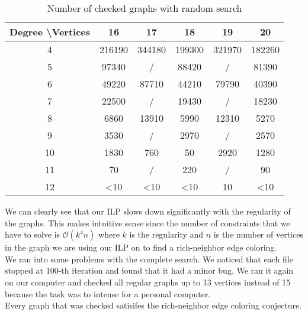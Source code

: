 \documentclass[12pt,a4paper]{amsart}
\theoremstyle{definition} %
\theoremstyle{plain} %
\begin{document}
    \begin{table}[!htbp]
        \begin{tabular}{|c|c|c|c|c|c|}
        \hline
        Degree \textbackslash Vertices & 16            & 17            & 18            & 19     & 20            \\ \hline
        4                              & 216190        & 344180        & 199300        & 321970 & 182260        \\
        5                              & 97340         & /             & 88420         & /      & 81390         \\
        6                              & 49220         & 87710         & 44210         & 79790  & 40390         \\
        7                              & 22500         & /             & 19430         & /      & 18230         \\
        8                              & 6860          & 13910         & 5990          & 12310  & 5270          \\
        9                              & 3530          & /             & 2970          & /      & 2570          \\
        10                             & 1830          & 760           & 50            & 2920   & 1280          \\
        11                             & 70            & /             & 220           & /      & 90            \\
        12                             & \textless{}10 & \textless{}10 & \textless{}10 & 10     & \textless{}10 \\ \hline
        \end{tabular}
        \caption{Number of checked graphs with random search}
        \label{table:2}
    \end{table}
    
    \noindent We can clearly see that our ILP slows down significantly with the regularity of the graphs. This makes intuitive sense since the number of constraints that we have to solve is $\mathcal{O}(k^4n)$ where $k$ is the regularity and $n$ is the number of vertices in the graph we are using our ILP on to find a rich-neighbor edge coloring.\\
    
    We ran into some problems with the complete search. We noticed that each file stopped at 100-th iteration and found that it had a minor bug. We ran it again on our computer and checked all regular graphs up to 13 vertices instead of 15 because the task was to intense for a personal computer.\\

    Every graph that was checked satisifes the rich-neighbor edge coloring conjecture.



\end{document}
